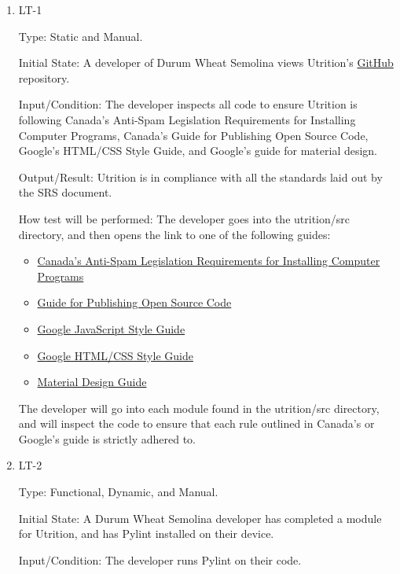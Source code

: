 \documentclass[12pt, titlepage]{article}
\begin{document}
	\begin{enumerate}
		\item{LT-1}
		
		Type: Static and Manual.
		
		Initial State: A developer of Durum Wheat Semolina views Utrition’s \href{https://github.com/jeff-rey-wang/utrition/}{GitHub} repository.
		
		Input/Condition: The developer inspects all code to ensure Utrition is following Canada’s Anti-Spam Legislation Requirements for Installing Computer Programs, Canada’s Guide for Publishing Open Source Code, Google’s HTML/CSS Style Guide, and Google’s guide for material design.
		
		Output/Result: Utrition is in compliance with all the standards laid out by the SRS document.
		
		How test will be performed: The developer goes into the utrition/src directory, and then opens the link to one of the following guides:
		\begin{itemize}
			\item \href{https://crtc.gc.ca/eng/internet/install.htm}{Canada’s Anti-Spam Legislation Requirements for Installing Computer Programs}
			\item \href{https://www.canada.ca/en/government/system/digital-government/digital-government-innovations/open-source-software/guide-for-publishing-open-source-code.html}{Guide for Publishing Open Source Code}
			\item \href{https://google.github.io/styleguide/jsguide.html}{Google JavaScript Style Guide}
			\item \href{https://google.github.io/styleguide/htmlcssguide.html}{Google HTML/CSS Style Guide}
			\item \href{https://material.io/design}{Material Design Guide}
		\end{itemize}
		The developer will go into each module found in the utrition/src directory, and will inspect the code to ensure that each rule outlined in Canada’s or Google’s guide is strictly adhered to.
		
		\item{LT-2}
		
		Type: Functional, Dynamic, and Manual.
		
		Initial State: A Durum Wheat Semolina developer has completed a module for Utrition, and has Pylint installed on their device.
		
		Input/Condition: The developer runs Pylint on their code.
		

\end{enumerate}
\end{document}
